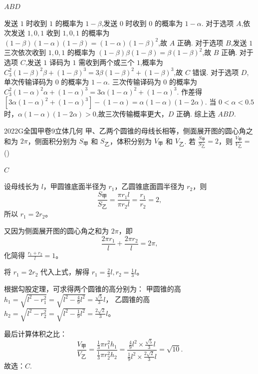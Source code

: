 \documentclass[12pt,UTF-8,a4paper]{ctexart}
\numberwithin{figure}{section}
\theoremstyle{mystyle}
\theoremstyle{mystylekaishu}
\theoremstyle{mystyle}
\numberwithin{xiti}{section}
\begin{document}
\begin{answer}
$ABD$
\end{answer}

\begin{solutions}
发送 $1$ 时收到 $1$ 的概率为 $1-\beta$,发送 $0$ 时收到 $0$ 的概率为 $1-\alpha$.
对于选项 $A$,依次发送 $1,0,1$ 收到 $1,0,1$ 的概率为 $(1-\beta)(1-\alpha)(1-\beta)=(1-\alpha)(1-\beta)^{2}$,故 $A$ 正确.
对于选项 $B$,发送 $1$ 三次依次收到 $1,0,1$ 的概率为 $(1-\beta)\beta(1-\beta)=\beta(1-\beta)^{2}$,故 $B$ 正确.
对于选项 $C$,发送 $1$ 译码为 $1$ 需收到两个或三个 $1$,概率为 $C_{3}^{2}(1-\beta)^{2}\beta+(1-\beta)^{3}=3\beta(1-\beta)^{2}+(1-\beta)^{3}$,故 $C$ 错误.
对于选项 $D$,单次传输译码为 $0$ 的概率为 $1-\alpha$. 三次传输译码为 $0$ 的概率为 $C_{3}^{2}(1-\alpha)^{2}\alpha+(1-\alpha)^{3}=3\alpha(1-\alpha)^{2}+(1-\alpha)^{3}$.
作差得 $[3\alpha(1-\alpha)^{2}+(1-\alpha)^{3}]-(1-\alpha)=\alpha(1-\alpha)(1-2\alpha)$.
当 $0<\alpha<0.5$ 时，$\alpha(1-\alpha)(1-2\alpha)>0$,故三次传输概率更大，$D$ 正确.
综上选 $ABD$.
\end{solutions}


\begin{problem}{2022}{G}{全国甲卷}{9}{立体几何}
甲、乙两个圆锥的母线长相等，侧面展开图的圆心角之和为 $2 \pi$，侧面积分别为 $S_{\text{甲}}$ 和 $S_{\text{乙}}$，体积分别为 $V_{\text{甲}}$ 和 $V_{\text{乙}}$. 若 $\frac{S_{\text{甲}}}{S_{\text{乙}}}=2$，则 $\frac{V_{\text{甲}}}{V_{\text{乙}}}=$ (\hspace{1cm})
\begin{choices}
\end{choices}
\end{problem}

\begin{answer}
$C$
\end{answer}

\begin{solutions}
设母线长为 $l$，甲圆锥底面半径为 $r_1$，乙圆锥底面圆半径为 $r_2$，则
$$
\frac{S_{\text{甲}}}{S_{\text{乙}}} = \frac{\pi r_1 l}{\pi r_2 l} = \frac{r_1}{r_2} = 2,
$$
所以 $r_1 = 2r_2$。

又因为侧面展开图的圆心角之和为 $2 \pi$，即
$$
\frac{2\pi r_1}{l} + \frac{2\pi r_2}{l} = 2\pi,
$$
化简得 $\frac{r_1 + r_2}{l} = 1$。

将 $r_1 = 2r_2$ 代入上式，解得 $r_1 = \frac{2}{3}l, r_2 = \frac{1}{3}l$。

根据勾股定理，可求得两个圆锥的高分别为：
甲圆锥的高 $h_1 = \sqrt{l^2 - r_1^2} = \sqrt{l^2 - \frac{4}{9}l^2} = \frac{\sqrt{5}}{3}l$，
乙圆锥的高 $h_2 = \sqrt{l^2 - r_2^2} = \sqrt{l^2 - \frac{1}{9}l^2} = \frac{2\sqrt{2}}{3}l$。

最后计算体积之比：
$$
\frac{V_{\text{甲}}}{V_{\text{乙}}} = \frac{\frac{1}{3}\pi r_1^2 h_1}{\frac{1}{3}\pi r_2^2 h_2} = \frac{\frac{4}{9}l^2 \times \frac{\sqrt{5}}{3}l}{\frac{1}{9}l^2 \times \frac{2\sqrt{2}}{3}l} = \sqrt{10}.
$$
故选：$C$.
\end{solutions}
\end{document}

